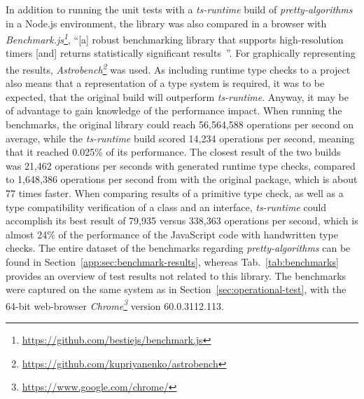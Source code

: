 In addition to running the unit tests with a \emph{ts-runtime} build of \emph{pretty-algorithms} in a Node.js environment, the library was also compared in a browser with \emph{Benchmark.js\footnote{\url{https://github.com/bestiejs/benchmark.js}}}, ``[a] robust benchmarking library that supports high-resolution timers [and] returns statistically significant results~\cite{Evaluation:benchmarkjs}''. For graphically representing the results, \emph{Astrobench\footnote{\url{https://github.com/kupriyanenko/astrobench}}} was used. As including runtime type checks to a project also means that a representation of a type system is required, it was to be expected, that the original build will outperform \emph{ts-runtime}. Anyway, it may be of advantage to gain knowledge of the performance impact. When running the benchmarks, the original library could reach 56,564,588 operations per second on average, while the \emph{ts-runtime} build scored 14,234 operations per second, meaning that it reached 0.025\% of its performance. The closest result of the two builds was 21,462 operations per seconds with generated runtime type checks, compared to 1,648,386 operations per second from with the original package, which is about 77 times faster. When comparing results of a primitive type check, as well as a type compatibility verification of a class and an interface, \emph{ts-runtime} could accomplish its best result of 79,935 versus 338,363 operations per second, which is almost 24\% of the performance of the JavaScript code with handwritten type checks. The entire dataset of the benchmarks regarding \emph{pretty-algorithms} can be found in Section~\ref{app:sec:benchmark-results}, whereas Tab.~\ref{tab:benchmarks} provides an overview of test results not related to this library. The benchmarks were captured on the same system as in Section~\ref{sec:operational-test}, with the 64-bit web-browser \emph{Chrome\footnote{\url{https://www.google.com/chrome/}}} version 60.0.3112.113.
